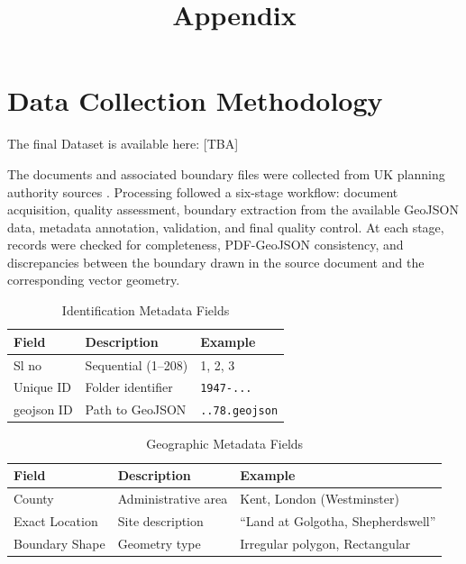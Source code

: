 \documentclass[11pt]{article}
\begin{document}
%


\clearpage
\setcounter{page}{1}

\appendix
\title{Appendix} 

\section{Data Collection Methodology}

The final Dataset is available here: [TBA]


The documents and associated boundary files were collected from UK planning authority sources \cite{}. Processing followed a six-stage workflow: document acquisition, quality assessment, boundary extraction from the available GeoJSON data, metadata annotation, validation, and final quality control. At each stage, records were checked for completeness, PDF-GeoJSON consistency, and discrepancies between the boundary drawn in the source document and the corresponding vector geometry.

\begin{table}[h]
\centering
\caption{Identification Metadata Fields}
\begin{tabular}{@{}lll@{}}
\toprule
\textbf{Field} & \textbf{Description} & \textbf{Example} \\ \midrule
Sl no & Sequential (1--208) & 1, 2, 3 \\
Unique ID & Folder identifier & \texttt{1947-...} \\
geojson ID & Path to GeoJSON & \texttt{..78.geojson} \\ \bottomrule
\end{tabular}
\label{Unique_Identification}
\end{table}


\begin{table}[h]
\centering
\caption{Geographic Metadata Fields}
\begin{tabular}{@{}lll@{}}
\toprule
\textbf{Field} & \textbf{Description} & \textbf{Example} \\ \midrule
County & Administrative area & Kent, London (Westminster) \\
Exact Location & Site description & ``Land at Golgotha, Shepherdswell'' \\
Boundary Shape & Geometry type & Irregular polygon, Rectangular \\ \bottomrule
\end{tabular}
\end{table}
\end{document}
